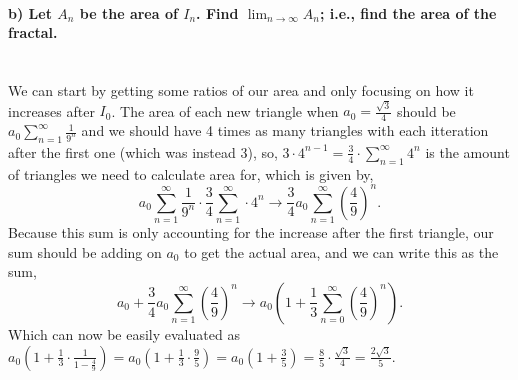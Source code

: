 \documentclass{report}
\begin{document}
\paragraph{b) Let $ A_n $ be the area of $ I_n $. Find $ \lim_{ n \to \infty} A_n  $; i.e., find the area of the fractal. \\ \\}
We can start by getting some ratios of our area and only focusing on how it increases after $ I_0 $. The area of each new triangle when $ a_0 = \frac{ \sqrt{ 3 }  }{ 4 } $ should be $ a_0 \sum_{ n=1 } ^{ \infty } \frac{1}{ 9^{ n } }  $ and we should have 4 times as many triangles with each itteration after the first one (which was instead 3), so, $ 3 \cdot 4^{ n-1 } = \frac{ 3 }{ 4 } \cdot \sum_{ n=1 } ^{ \infty } 4^{ n } $ is the amount of triangles we need to calculate area for, which is given by,
 \[
a_0\sum_{ n=1 } ^{ \infty }\frac{ 1 }{ 9^{ n } }\cdot \frac{ 3 }{ 4 } \sum_{ n=1 } ^{ \infty } \cdot 4^{ n } \to \frac{ 3 }{ 4 } a_0 \sum_{ n=1 } ^{ \infty } \left( \frac{ 4 }{ 9 }  \right)^{ n }
.\] 
Because this sum is only accounting for the increase after the first triangle, our sum should be adding on $ a_0 $ to get the actual area, and we can write this as the sum,
\[
	a_0 + \frac{ 3 }{ 4 } a_0 \sum_{ n=1 } ^{ \infty } \left( \frac{ 4 }{ 9 }  \right)^{ n } \to a_0\left(   1+\frac{ 1 }{ 3 } \sum_{ n=0 } ^{ \infty } \left( \frac{ 4 }{ 9 }  \right) ^{ n }\right)
.\] 
Which can now be easily evaluated as $ a_0\left( 1+\frac{ 1 }{ 3 } \cdot \frac{ 1 }{ 1-\frac{ 4 }{ 9 } } \right) = a_0\left( 1+\frac{ 1 }{ 3 } \cdot \frac{ 9 }{ 5 } \right) = a_0\left( 1+\frac{ 3 }{ 5 } \right) = \frac{ 8 }{ 5 } \cdot \frac{ \sqrt{ 3 }  }{ 4 } = \frac{ 2\sqrt{ 3 }  }{ 5 }$. 
\end{document}
